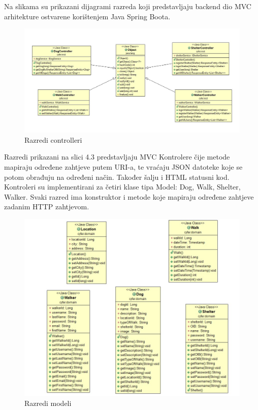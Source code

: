 			\fi
			
			
			Na slikama su prikazani dijagrami razreda koji predstavljaju backend dio MVC arhitekture ostvarene korištenjem Java Spring Boota.
			
			\vspace{15pt} 
			\begin{figure}[H]
				\includegraphics[scale=0.4]{dijagrami/controlleri.jpg} %
				\centering
				\caption{Razredi controlleri}
				\label{fig:controlleri}
			\end{figure}
			
			
			Razredi prikazani na slici 4.3 predstavljaju MVC Kontrolere čije metode mapiraju određene zahtjeve putem URI-a, te vraćaju JSON datoteke koje se potom obrađuju na određeni način. Također šalju i HTML statusni kod.
			Kontroleri su implementirani za četiri klase tipa Model: Dog, Walk, Shelter, Walker. Svaki razred ima konstruktor i metode koje mapiraju određene zahtjeve zadanim HTTP zahtjevom.
			
				\vspace{15pt} 
			\begin{figure}[H]
				\includegraphics[scale=0.5]{dijagrami/modeli.jpg} %
				\centering
				\caption{Razredi modeli}
				\label{fig:modeli}
			\end{figure}
			
